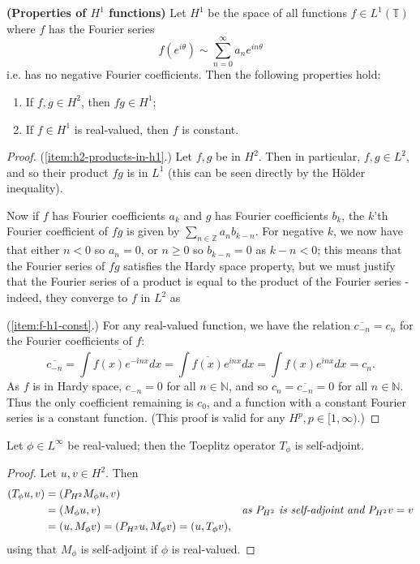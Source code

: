 \documentclass[../main.tex]{subfiles}
\begin{document}
\begin{lemma}{\textbf{(Properties of $H^1$ functions)}}
\label{thm:h1-properties}
  Let $H^1$ be the space of all functions $f \in L^1(\mathbb{T})$ where $f$ has
  the Fourier series
  $$f(e^{i \theta}) \sim \sum_{n=0}^\infty a_n e^{i n \theta}$$
  i.e. has no negative Fourier coefficients. Then the following properties hold:
  \begin{enumerate}
    \item\label{item:h2-products-in-h1} If $f, g \in H^2$, then $fg \in H^1$;
    \item\label{item:f-h1-const} If $f \in H^1$ is real-valued, then $f$ is constant.
  \end{enumerate}
\end{lemma}
\begin{proof}
(\ref{item:h2-products-in-h1}.) Let $f, g$ be in $H^2$. Then in particular, $f,
g \in L^2$, and so their product $fg$ is in $L^1$ (this can be seen
directly by the H\"older inequality).

Now if $f$ has Fourier coefficients $a_k$ and $g$ has Fourier coefficients $b_k$,
the $k$'th Fourier coefficient of $fg$ is given by 
$\sum_{n \in \mathbb{Z}} a_n b_{k-n}$. For negative $k$, 
we now have that either $n < 0$ so $a_n = 0$, or $n \geq 0$ so $b_{k-n} = 0$
as $k-n < 0$; this means that the Fourier series of $fg$ satisfies
the Hardy space property, but we must justify that the Fourier series of a
product is equal to the product of the Fourier series
- indeed, they converge to $f$ in $L^2$ as %

(\ref{item:f-h1-const}.) For any real-valued function, we have the relation
$\overline{c_{-n}} = c_n$ for the Fourier coefficients of $f$:
  $$
  \overline{c_{-n}} = \overline{\int f(x) e^{-inx} dx} 
		    = \int \overline{f(x)} e^{inx} dx 
		    = \int f(x) e^{inx} dx = c_n.
  $$
As $f$ is in Hardy space, $c_{-n} = 0$ for all $n \in \mathbb{N}$, and so $c_n =
\overline{c_{-n}} = 0$ for all $n \in \mathbb{N}$. Thus the only
coefficient remaining is $c_0$, and a function with a constant Fourier
series is a constant function. (This proof is valid for any $H^p, p \in
[1, \infty)$.)
\end{proof}

\begin{lemma}
\label{thm:toeplitz-self-adjoint}
  Let $\phi \in L^\infty$ be real-valued; then the Toeplitz operator $T_\phi$ is self-adjoint. 
\end{lemma}
\begin{proof}
Let $u, v \in H^2$. Then 
\begin{align*}
(T_\phi u, v) & = ( P_{H^2}M_\phi u, v) & \\
& = (M_\phi u, v) & \text{\emph{as $P_{H^2}$ is self-adjoint and $P_{H^2}v = v$}}\\
& = (u, M_\phi v) = (P_{H^2}u, M_\phi v) = (u, T_\phi v),
\end{align*}
using that $M_\phi$ is self-adjoint if $\phi$ is real-valued.
\end{proof}
\end{document}
